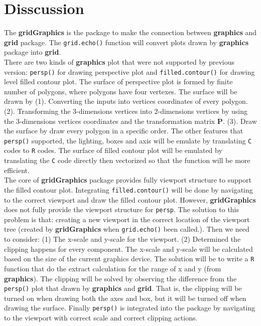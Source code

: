 \documentclass[11pt,twoside]{report}
\begin{document}
\section{Disscussion}
The \textbf{gridGraphics} is the package to make the connection between \textbf{graphics} and \textbf{grid} package. The \texttt{grid.echo()} function will convert plots drawn by \textbf{graphics} package into \textbf{grid}.\\

There are two kinds of \textbf{graphics} plot that were not supported by previous version: \texttt{persp()} for drawing perspective plot and \texttt{filled.contour()} for drawing level filled contour plot. The surface of perspective plot is formed by finite number of polygons, where polygons have four vertexes. The surface will be drawn by (1). Converting the inputs into vertices coordinates of every polygon. (2). Transforming the 3-dimensions vertices into 2-dimensions vertices by using the 3-dimensions vertices coordinates and the transformation matrix \textbf{P}. (3). Draw the surface by draw every polygon in a specific order. The other features that \texttt{persp()} supported, the lighting, boxes and axis will be emulate by translating \texttt{C} codes to \texttt{R} codes. The surface of filled contour plot will be emulated by translating the \texttt{C} code directly then vectorized so that the function will be more efficient. \\

The core of \textbf{gridGraphics} package provides fully viewport structure to support the filled contour plot. Integrating \texttt{filled.contour()} will be done by navigating to the correct viewport and draw the filled contour plot. However, \textbf{gridGraphics} does not fully provide the viewport structure for \texttt{persp}. The solution to this problem is that: creating a new viewport in the correct location of the viewport tree (created by \textbf{gridGraphics} when \texttt{grid.echo()} been called.). Then we need to consider: (1) The x-scale and y-scale for the viewport. (2) Determined the clipping happens for every component. The x-scale and y-scale will be calculated based on the size of the current graphics device. The solution will be to write a \texttt{R} function that do the extract calculation for the range of x and y (from \textbf{graphics}). The clipping will be solved by observing the difference from the \texttt{persp()} plot that drawn by \textbf{graphics} and \textbf{grid}. That is, the clipping will be turned on when drawing both the axes and box, but it will be turned off when drawing the surface. Finally \texttt{persp()} is integrated into the package by navigating to the viewport with correct scale and correct clipping actions.\\
\end{document}
